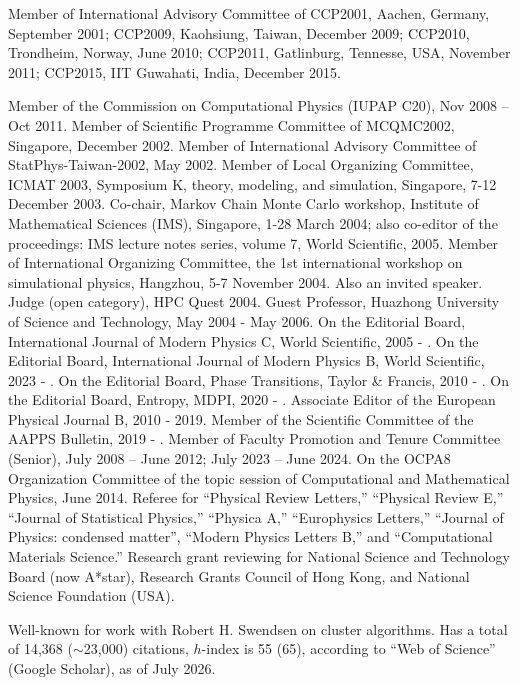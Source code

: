 \bul Member of International Advisory Committee of CCP2001, 
       Aachen, Germany, September 2001;
       CCP2009, Kaohsiung, Taiwan, December 2009; 
       CCP2010, Trondheim, Norway, June 2010;
       CCP2011, Gatlinburg, Tennesse, USA, November 2011;
       CCP2015, IIT Guwahati, India, December 2015.

\bul Member of the Commission on Computational Physics (IUPAP C20), Nov 2008 -- Oct 2011.
\bul Member of Scientific Programme Committee of MCQMC2002, 
       Singapore, December 2002.
\bul Member of International Advisory Committee of StatPhys-Taiwan-2002,
       May 2002.
\bul Member of Local Organizing Committee, ICMAT 2003, Symposium K, 
     theory, modeling, and simulation, Singapore, 7-12 December 2003.
\bul Co-chair, Markov Chain Monte Carlo workshop,  Institute of Mathematical
     Sciences (IMS), Singapore, 1-28 March 2004; also co-editor of the 
     proceedings:
     IMS lecture notes series, volume 7, World Scientific, 2005.
\bul Member of International Organizing Committee, the 1st international
     workshop on simulational physics, Hangzhou, 5-7 November 2004.  Also
     an invited speaker.
\bul Judge (open category), HPC Quest 2004.
\bul Guest Professor, Huazhong University of Science and Technology, May 2004
     - May 2006.
\bul On the Editorial Board, International Journal of Modern Physics C, World Scientific, 2005 - .
\bul On the Editorial Board, International Journal of Modern Physics B, World Scientific, 2023 - .
\bul On the Editorial Board, Phase Transitions, Taylor \& Francis, 2010 - .
\bul On the Editorial Board, Entropy, MDPI, 2020 - .
\bul Associate Editor of the European Physical Journal B, 2010 - 2019.
\bul Member of the Scientific Committee of the AAPPS Bulletin, 2019 - .
\bul Member of Faculty Promotion and Tenure Committee (Senior), July 2008 -- June 2012; July 2023 -- June 2024. 
\bul On the OCPA8 Organization Committee of the topic session of Computational 
and Mathematical Physics, June 2014.
\bul Referee for  ``Physical Review Letters,'' ``Physical Review E,'' 
     ``Journal of Statistical Physics,'' ``Physica A,'' ``Europhysics Letters,''  
     ``Journal of Physics: condensed matter'', ``Modern Physics Letters B,'' 
     and ``Computational Materials Science.''
\bul Research grant reviewing for National Science and Technology 
     Board (now A*star), Research Grants Council of Hong Kong, and
     National Science Foundation (USA). 


\item{} Well-known for work with Robert H. Swendsen on cluster algorithms.
Has a total of 14,368 ($\sim$23,000) citations, $h$-index is 55 (65),
according to ``Web of Science'' (Google Scholar), as of July 2026. 

